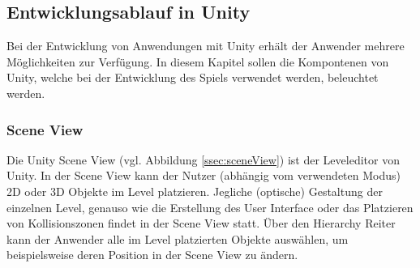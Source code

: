 \subsection{Entwicklungsablauf in Unity}
Bei der Entwicklung von Anwendungen mit Unity erhält der Anwender mehrere Möglichkeiten zur Verfügung. In diesem Kapitel sollen die Kompontenen von Unity, welche bei der Entwicklung des Spiels verwendet werden, beleuchtet werden.

\subsubsection{Scene View}
Die Unity Scene View (vgl. Abbildung \ref{ssec:sceneView}) ist der Leveleditor von Unity. In der Scene View kann der Nutzer (abhängig vom verwendeten Modus) 2D oder 3D Objekte im Level platzieren. Jegliche (optische) Gestaltung der einzelnen Level, genauso wie die Erstellung des User Interface oder das Platzieren von Kollisionszonen findet in der Scene View statt. Über den Hierarchy Reiter kann der Anwender alle im Level platzierten Objekte auswählen, um beispielsweise deren Position in der Scene View zu ändern.

